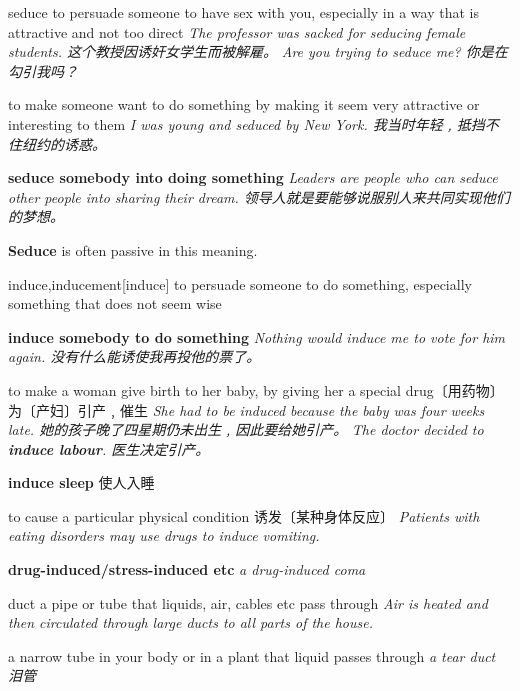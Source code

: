 \begin{DefWord}{seduce}
    to persuade someone to have sex with you, especially in a way that is attractive and not too direct
    \textit{The professor was sacked for seducing female students. 这个教授因诱奸女学生而被解雇。}
    \textit{Are you trying to seduce me? 你是在勾引我吗？}

    to make someone want to do something by making it seem very attractive or interesting to them
    \textit{I was young and seduced by New York. 我当时年轻﹐抵挡不住纽约的诱惑。}

    \textbf{seduce somebody into doing something}
    \textit{Leaders are people who can seduce other people into sharing their dream. 领导人就是要能够说服别人来共同实现他们的梦想。}

    \begin{remark}
        \textbf{Seduce} is often passive in this meaning.
    \end{remark}
\end{DefWord}

\begin{DefWord}{induce,inducement}[induce]
    to persuade someone to do something, especially something that does not seem wise

    \textbf{induce somebody to do something}
    \textit{Nothing would induce me to vote for him again. 没有什么能诱使我再投他的票了。}

    to make a woman give birth to her baby, by giving her a special drug〔用药物〕为〔产妇〕引产﹐催生
    \textit{She had to be induced because the baby was four weeks late. 她的孩子晚了四星期仍未出生﹐因此要给她引产。}
    \textit{The doctor decided to \textbf{induce labour}. 医生决定引产。}

    \textbf{induce sleep} 使人入睡

    to cause a particular physical condition 诱发〔某种身体反应〕
    \textit{Patients with eating disorders may use drugs to induce vomiting.}

    \textbf{drug-induced/stress-induced etc}
    \textit{a drug-induced coma}
\end{DefWord}

\begin{DefWord}{duct}
    a pipe or tube that liquids, air, cables etc pass through
    \textit{Air is heated and then circulated through large ducts to all parts of the house.}

    a narrow tube in your body or in a plant that liquid passes through
    \textit{a tear duct 泪管}
\end{DefWord}

